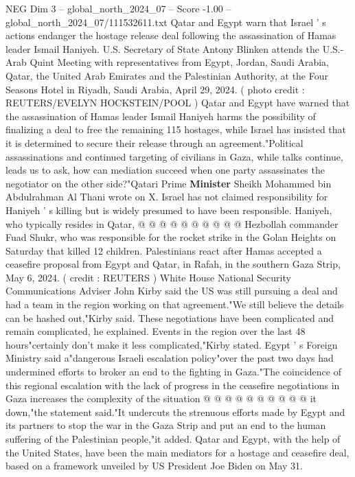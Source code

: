 \begin{textsample}{NEG Dim 3 – global\_north\_2024\_07 – Score -1.00 – global\_north\_2024\_07/111532611.txt}  \label{ex:f3_neg_369}
Qatar and Egypt warn that Israel ' s actions endanger the hostage release deal following the assassination of Hamas leader Ismail Haniyeh.
U.S.
Secretary of State Antony Blinken attends the U.S.-Arab Quint Meeting with representatives from Egypt, Jordan, Saudi Arabia, Qatar, the United Arab Emirates and the Palestinian Authority, at the Four Seasons Hotel in Riyadh, Saudi Arabia, April 29, 2024. ( photo credit : REUTERS/EVELYN HOCKSTEIN/POOL ) Qatar and Egypt have warned that the assassination of Hamas leader Ismail Haniyeh harms the possibility of finalizing a deal to free the remaining 115 hostages, while Israel has insisted that it is determined to secure their release through an agreement."Political assassinations and continued targeting of civilians in Gaza, while talks continue, leads us to ask, how can mediation succeed when one party assassinates the negotiator on the other side?"Qatari Prime \textbf{Minister} Sheikh Mohammed bin Abdulrahman Al Thani wrote on X.
Israel has not claimed responsibility for Haniyeh ' s killing but is widely presumed to have been responsible.
Haniyeh, who typically resides in Qatar, @ @ @ @ @ @ @ @ @ @ Hezbollah commander Fuad Shukr, who was responsible for the rocket strike in the Golan Heights on Saturday that killed 12 children.
Palestinians react after Hamas accepted a ceasefire proposal from Egypt and Qatar, in Rafah, in the southern Gaza Strip, May 6, 2024. ( credit : REUTERS ) White House National Security Communications Adviser John Kirby said the US was still pursuing a deal and had a team in the region working on that agreement."We still believe the details can be hashed out,"Kirby said.
These negotiations have been complicated and remain complicated, he explained.
Events in the region over the last 48 hours"certainly don't make it less complicated,"Kirby stated.
Egypt ' s Foreign Ministry said a"dangerous Israeli escalation policy"over the past two days had undermined efforts to broker an end to the fighting in Gaza."The coincidence of this regional escalation with the lack of progress in the ceasefire negotiations in Gaza increases the complexity of the situation @ @ @ @ @ @ @ @ @ @ it down,"the statement said."It undercuts the strenuous efforts made by Egypt and its partners to stop the war in the Gaza Strip and put an end to the human suffering of the Palestinian people,"it added.
Qatar and Egypt, with the help of the United States, have been the main mediators for a hostage and ceasefire deal, based on a framework unveiled by US President Joe Biden on May 31.

\end{textsample}
